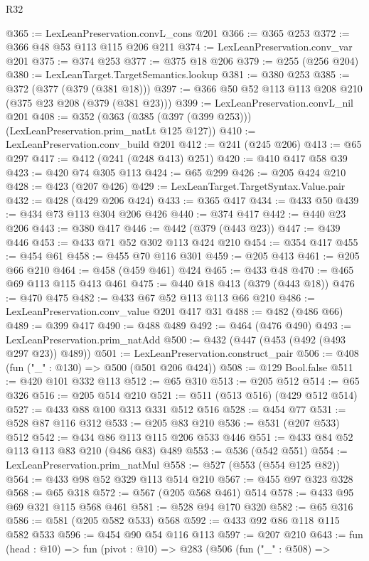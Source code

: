 \begin{lexlean}{R32}
\begin{coremodule}
@365 := LexLeanPreservation.convL_cons @201
@366 := @365 @253
@372 := @366 @48 @53 @113 @115 @206 @211
@374 := LexLeanPreservation.conv_var @201
@375 := @374 @253
@377 := @375 @18 @206
@379 := @255 (@256 @204)
@380 := LexLeanTarget.TargetSemantics.lookup
@381 := @380 @253
@385 := @372 (@377 (@379 (@381 @18)))
@397 := @366 @50 @52 @113 @113 @208 @210 (@375 @23 @208 (@379 (@381 @23)))
@399 := LexLeanPreservation.convL_nil @201
@408 := @352 (@363 (@385 (@397 (@399 @253))) (LexLeanPreservation.prim_natLt @125 @127))
@410 := LexLeanPreservation.conv_build @201
@412 := @241 (@245 @206)
@413 := @65 @297
@417 := @412 (@241 (@248 @413) @251)
@420 := @410 @417 @58 @39
@423 := @420 @74 @305 @113
@424 := @65 @299
@426 := @205 @424 @210
@428 := @423 (@207 @426)
@429 := LexLeanTarget.TargetSyntax.Value.pair
@432 := @428 (@429 @206 @424)
@433 := @365 @417
@434 := @433 @50
@439 := @434 @73 @113 @304 @206 @426
@440 := @374 @417
@442 := @440 @23 @206
@443 := @380 @417
@446 := @442 (@379 (@443 @23))
@447 := @439 @446
@453 := @433 @71 @52 @302 @113 @424 @210
@454 := @354 @417
@455 := @454 @61
@458 := @455 @70 @116 @301
@459 := @205 @413
@461 := @205 @66 @210
@464 := @458 (@459 @461) @424
@465 := @433 @48
@470 := @465 @69 @113 @115 @413 @461
@475 := @440 @18 @413 (@379 (@443 @18))
@476 := @470 @475
@482 := @433 @67 @52 @113 @113 @66 @210
@486 := LexLeanPreservation.conv_value @201 @417 @31
@488 := @482 (@486 @66)
@489 := @399 @417
@490 := @488 @489
@492 := @464 (@476 @490)
@493 := LexLeanPreservation.prim_natAdd
@500 := @432 (@447 (@453 (@492 (@493 @297 @23)) @489))
@501 := LexLeanPreservation.construct_pair
@506 := @408 (fun ("_" : @130) => @500 (@501 @206 @424))
@508 := @129 Bool.false
@511 := @420 @101 @332 @113
@512 := @65 @310
@513 := @205 @512
@514 := @65 @326
@516 := @205 @514 @210
@521 := @511 (@513 @516) (@429 @512 @514)
@527 := @433 @88 @100 @313 @331 @512 @516
@528 := @454 @77
@531 := @528 @87 @116 @312
@533 := @205 @83 @210
@536 := @531 (@207 @533) @512
@542 := @434 @86 @113 @115 @206 @533 @446
@551 := @433 @84 @52 @113 @113 @83 @210 (@486 @83) @489
@553 := @536 (@542 @551)
@554 := LexLeanPreservation.prim_natMul
@558 := @527 (@553 (@554 @125 @82))
@564 := @433 @98 @52 @329 @113 @514 @210
@567 := @455 @97 @323 @328
@568 := @65 @318
@572 := @567 (@205 @568 @461) @514
@578 := @433 @95 @69 @321 @115 @568 @461
@581 := @528 @94 @170 @320
@582 := @65 @316
@586 := @581 (@205 @582 @533) @568
@592 := @433 @92 @86 @118 @115 @582 @533
@596 := @454 @90 @54 @116 @113
@597 := @207 @210
@643 := fun (head : @10) =>
  fun (pivot : @10) =>
  @283
    (@506
      (fun ("_" : @508) =>

\end{coremodule}
\end{lexlean}
